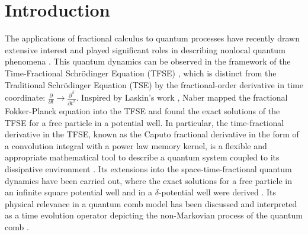 \documentclass[
showpacs,  %
showkeys,  %
aps,       %
amsthm,    %
amsmath,   %
amsfonts,  %
amssymb    %
]{revtex4-1}          %
\begin{document}
\section{Introduction}
\label{intro}
The applications of fractional calculus to quantum processes have recently drawn extensive interest and played significant roles in describing nonlocal quantum phenomena \cite{Naber2004,Iomin2009,Ertik2010,Sirin2011,Achar2013,Iomin2019}. This quantum dynamics can be observed in the framework of the Time-Fractional Schr\"{o}dinger Equation (TFSE) \cite{Naber2004}, which is distinct from the Traditional Schr\"{o}dinger Equation (TSE) by the fractional-order derivative in time coordinate: $\frac{\partial }{{\partial t}} \rightarrow \frac{{{\partial ^\beta }}}{{\partial {t^\beta }}}$. Inspired by Laskin's work \cite{1Laskin2000,2Laskin2000}, Naber mapped the fractional Fokker-Planck equation into the TFSE and found the exact solutions of the TFSE for a free particle in a potential well. In particular, the time-fractional derivative in the TFSE, known as the Caputo fractional derivative in the form of a convolution integral with a power law memory kernel, is a flexible and appropriate mathematical tool to describe a quantum system coupled to its dissipative environment \cite{Tarasov2008,Iomin2009,Laskin2017}. Its extensions into the space-time-fractional quantum dynamics have been carried out, where the exact solutions for a free particle in an infinite square potential well and in a $\delta$-potential well were derived \cite{Wang2007,Dong2008}. Its physical relevance in a quantum comb model has been discussed and interpreted as a time evolution operator depicting the non-Markovian process of the quantum comb \cite{Iomin2009,Iomin2011}.
\end{document}
